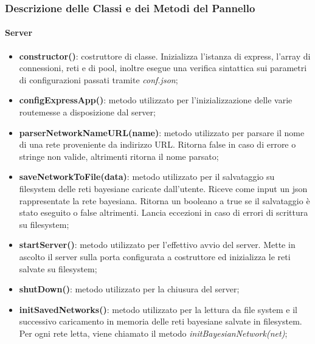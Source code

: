 \subsubsection{Descrizione delle Classi e dei Metodi del Pannello}\label{descrizionearchServer}

\paragraph{Server}

\begin{itemize}

	\item \textbf{constructor()}: costruttore di classe. Inizializza l'istanza di express\glossario , l'array di
	 connessioni, reti e di pool, inoltre esegue una verifica sintattica sui parametri di configurazioni passati 
	 tramite \textit{conf.json};

	 \item \textbf{configExpressApp()}: metodo utilizzato per l'inizializzazione delle varie route\glossario messe 
	 a disposizione dal server;

	 \item \textbf{parserNetworkNameURL(name)}: metodo utilizzato per parsare il nome di una rete 	
	 proveniente da indirizzo URL. 
	 Ritorna false in caso di errore o stringe non valide, altrimenti ritorna il nome parsato;

	 \item \textbf{saveNetworkToFile(data)}: metodo utilizzato per il salvataggio su filesystem delle reti 
	 bayesiane caricate dall'utente. Riceve come input un json rappresentate la rete bayesiana. Ritorna un 	
	 booleano a true se il salvataggio è stato eseguito o false altrimenti. Lancia eccezioni in caso di errori di 
	 scrittura su filesystem;

	 \item \textbf{startServer()}: metodo utilizzato per l'effettivo avvio del server. Mette in ascolto il server 
	 sulla porta configurata a costruttore ed inizializza le reti salvate su filesystem; 

	 \item \textbf{shutDown()}: metodo utilizzato per la chiusura del server; 

	 \item \textbf{initSavedNetworks()}: metodo utilizzato per  la lettura da file system e il successivo
	 caricamento in memoria  delle reti bayesiane salvate in filesystem. Per ogni rete letta, viene chiamato
	 il metodo \textit{initBayesianNetwork(net)};


\end{itemize}
